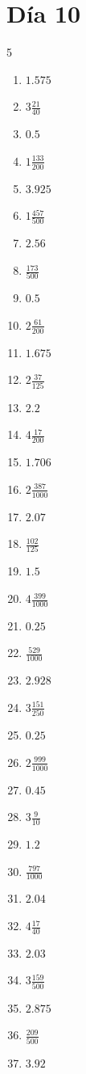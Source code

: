 \documentclass[12pt]{article}
\begin{document}
\section*{Día 10}
\begin{multicols}{5}\begin{enumerate}
		\item $ 1.575 $
		\item $ 3 \frac{21}{40} $
		\item $ 0.5 $
		\item $ 1 \frac{133}{200} $
		\item $ 3.925 $
		\item $ 1 \frac{457}{500} $
		\item $ 2.56 $
		\item $ \frac{173}{500} $
		\item $ 0.5 $
		\item $ 2 \frac{61}{200} $
		\item $ 1.675 $
		\item $ 2 \frac{37}{125} $
		\item $ 2.2 $
		\item $ 4 \frac{17}{200} $
		\item $ 1.706 $
		\item $ 2 \frac{387}{1000} $
		\item $ 2.07 $
		\item $ \frac{102}{125} $
		\item $ 1.5 $
		\item $ 4 \frac{399}{1000} $
		\item $ 0.25 $
		\item $ \frac{529}{1000} $
		\item $ 2.928 $
		\item $ 3 \frac{151}{250} $
		\item $ 0.25 $
		\item $ 2 \frac{999}{1000} $
		\item $ 0.45 $
		\item $ 3 \frac{9}{10} $
		\item $ 1.2 $
		\item $ \frac{797}{1000} $
		\item $ 2.04 $
		\item $ 4 \frac{17}{40} $
		\item $ 2.03 $
		\item $ 3 \frac{159}{500} $
		\item $ 2.875 $
		\item $ \frac{209}{500} $
		\item $ 3.92 $

\end{enumerate}
\end{multicols}
\end{document}
